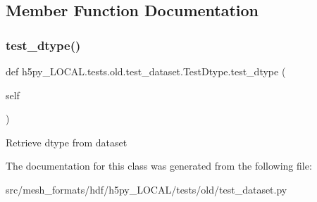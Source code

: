 \subsection{Member Function Documentation}
\mbox{\label{classh5py__LOCAL_1_1tests_1_1old_1_1test__dataset_1_1TestDtype_ac3aa075476eb46d900f6f8da0065e683}} 
\subsubsection{\texorpdfstring{test\+\_\+dtype()}{test\_dtype()}}
{\footnotesize\ttfamily def h5py\+\_\+\+L\+O\+C\+A\+L.\+tests.\+old.\+test\+\_\+dataset.\+Test\+Dtype.\+test\+\_\+dtype (\begin{DoxyParamCaption}\item[{}]{self }\end{DoxyParamCaption})}

\begin{DoxyVerb}Retrieve dtype from dataset \end{DoxyVerb}
 

The documentation for this class was generated from the following file\+:\begin{DoxyCompactItemize}
\item 
src/mesh\+\_\+formats/hdf/h5py\+\_\+\+L\+O\+C\+A\+L/tests/old/test\+\_\+dataset.\+py\end{DoxyCompactItemize}
